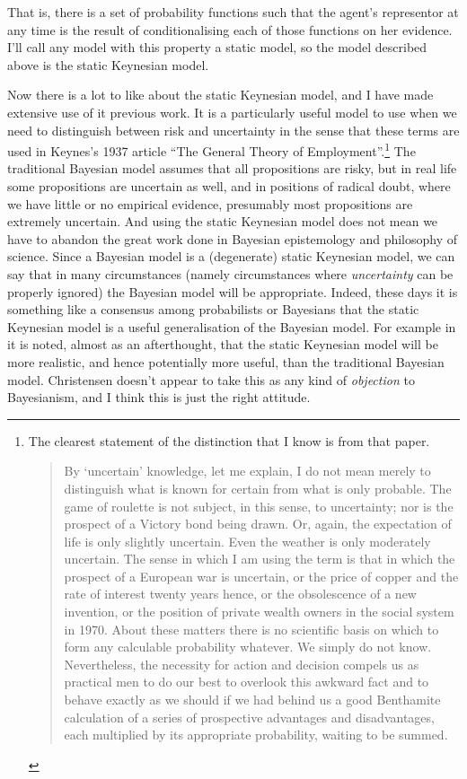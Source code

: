 \noindent That is, there is a set of probability functions such that the agent's representor at any time is the result of conditionalising each of those functions on her evidence. I'll call any model with this property a static model, so the model described above is the static Keynesian model.

Now there is a lot to like about the static Keynesian model, and I have made extensive use of it previous work. It is a particularly useful model to use when we need to distinguish between risk and uncertainty in the sense that these terms are used in Keynes's 1937 article ``The General Theory of Employment''.\footnote{The clearest statement of the distinction that I know is from that paper.
\begin{quote}
By `uncertain' knowledge, let me explain, I do not mean merely to distinguish what is known for certain from what is only probable. The game of roulette is not subject, in this sense, to uncertainty; nor is the prospect of a Victory bond being drawn. Or, again, the expectation of life is only slightly uncertain. Even the weather is only moderately uncertain. The sense in which I am using the term is that in which the prospect of a European war is uncertain, or the price of copper and the rate of interest twenty years hence, or the obsolescence of a new invention, or the position of private wealth owners in the social system in 1970. About these matters there is no scientific basis on which to form any calculable probability whatever. We simply do not know. Nevertheless, the necessity for action and decision compels us as practical men to do our best to overlook this awkward fact and to behave exactly as we should if we had behind us a good Benthamite calculation of a series of prospective advantages and disadvantages, each multiplied by its appropriate probability, waiting to be summed. \cite[114-5]{Keynes1937}
\end{quote}
} The traditional Bayesian model assumes that all propositions are risky, but in real life some propositions are uncertain as well, and in positions of radical doubt, where we have little or no empirical evidence, presumably most propositions are extremely uncertain. And using the static Keynesian model does not mean we have to abandon the great work done in Bayesian epistemology and philosophy of science. Since a Bayesian model is a (degenerate) static Keynesian model, we can say that in many circumstances (namely circumstances where \textit{uncertainty} can be properly ignored) the Bayesian model will be appropriate. Indeed, these days it is something like a consensus among probabilists or Bayesians that the static Keynesian model is a useful generalisation of the Bayesian model. For example in \citet{Christensen2005} it is noted, almost as an afterthought, that the static Keynesian model will be more realistic, and hence potentially more useful, than the traditional Bayesian model. Christensen doesn't appear to take this as any kind of \textit{objection} to Bayesianism, and I think this is just the right attitude.

